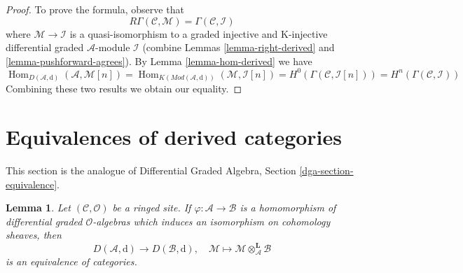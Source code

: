 \documentclass{stacks-project}
\theoremstyle{plain}
\newtheorem{lemma}[subsection]{Lemma}
\theoremstyle{definition}
\theoremstyle{remark}
\numberwithin{equation}{subsection}
\def\Hom{\mathop{\mathrm{Hom}}\nolimits}
\begin{document}
\begin{proof}
To prove the formula, observe that
$$
R\Gamma(\mathcal{C}, \mathcal{M}) = \Gamma(\mathcal{C}, \mathcal{I})
$$
where $\mathcal{M} \to \mathcal{I}$ is a quasi-isomorphism
to a graded injective and K-injective differential graded
$\mathcal{A}$-module $\mathcal{I}$ (combine
Lemmas \ref{lemma-right-derived} and \ref{lemma-pushforward-agrees}).
By Lemma \ref{lemma-hom-derived} we have
$$
\Hom_{D(\mathcal{A}, \text{d})}(\mathcal{A}, \mathcal{M}[n]) =
\Hom_{K(\textit{Mod}(\mathcal{A}, \text{d}))}(\mathcal{M}, \mathcal{I}[n]) =
H^0(\Gamma(\mathcal{C}, \mathcal{I}[n])) =
H^n(\Gamma(\mathcal{C}, \mathcal{I}))
$$
Combining these two results we obtain our equality.
\end{proof}








\section{Equivalences of derived categories}
\label{section-equivalence}

\noindent
This section is the analogue of
Differential Graded Algebra, Section \ref{dga-section-equivalence}.

\begin{lemma}
\label{lemma-qis-equivalence}
Let $(\mathcal{C}, \mathcal{O})$ be a ringed site.
If $\varphi : \mathcal{A} \to \mathcal{B}$ is a homomorphism of
differential graded $\mathcal{O}$-algebras which induces an
isomorphism on cohomology sheaves, then
$$
D(\mathcal{A}, \text{d}) \longrightarrow D(\mathcal{B}, \text{d}), \quad
\mathcal{M}
\longmapsto
\mathcal{M} \otimes_\mathcal{A}^\mathbf{L} \mathcal{B}
$$
is an equivalence of categories.
\end{lemma}
\end{document}
